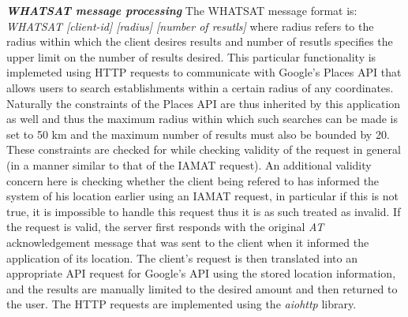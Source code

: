 \noindent\textbf{\emph{WHATSAT message processing}}\newline
\noindent The WHATSAT message format is: \newline \emph{WHATSAT [client-id] [radius] [number of resutls]} where radius refers to the radius within which the client desires results and number of resutls specifies the upper limit on the number of results desired. This particular functionality is implemeted using HTTP requests to communicate with Google's Places API that allows users to search establishments within a certain radius of any coordinates. Naturally the constraints of the Places API are thus inherited by this application as well and thus the maximum radius within which such searches can be made is set to 50 km and the maximum number of results must also be bounded by 20. These constraints are checked for while checking validity of the request in general (in a manner similar to that of the IAMAT request). An additional validity concern here is checking whether the client being refered to has informed the system of his location earlier using an IAMAT request, in particular if this is not true, it is impossible to handle this request thus it is as such treated as invalid. If the request is valid, the server first responds with the original \emph{AT} acknowledgement message that was sent to the client when it informed the application of its location. The client's request is then translated into an appropriate API request for Google's API using the stored location information, and the results are manually limited to the desired amount and then returned to the user. The HTTP requests are implemented using the \emph{aiohttp} library. \newline

